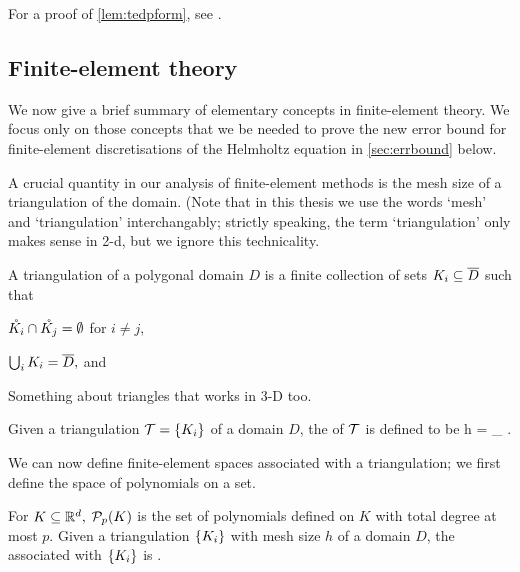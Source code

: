 For a proof of \cref{lem:tedpform}, see \cite[Lemma A.7]{GrPeSp:19}.
  
\subsection{Finite-element theory}\label{sec:fetheory}

We now give a brief summary of elementary concepts in finite-element theory. We focus only on those concepts that we be needed to
prove the new error bound for finite-element discretisations of the Helmholtz equation in \cref{sec:errbound} below.

    A crucial quantity in our analysis of finite-element methods is the mesh size of a triangulation of the domain. (Note that in this thesis we use the words `mesh' and `triangulation' interchangably; strictly speaking, the term `triangulation' only makes sense in 2-d, but we ignore this technicality.

    \bde[Triangulation]
    A triangulation of a polygonal domain $D$ is a finite collection of sets $K_{i} \subseteq \overline{D}$ such that
    \ben
  \item $\mathring{K_{i}} \cap \mathring{K_{j}} = \emptyset$ for $ i \neq j,$
  \item $\bigcup_i K_{i} = \overline{D},$ and
    \item Something about triangles that works in 3-D too.
    \een
    \ede{}

Given a triangulation $\cT = \set{\Ki}$ of a domain $D$, the  of $\mathcal T$ is defined to be
\beqs
h = \max_{\Ki} \diam{\Ki}.
\eeqs
\ede

    We can now define finite-element spaces associated with a triangulation; we first define the space of polynomials on a set.

For $K \subseteq \mathbb R^{d},$ $\polyp{K}$ is the set of polynomials defined on $K$ with total degree at most $p.$
\ede
    \label{def:fespace}
    Given a triangulation $\set{\Ki}$ with mesh size $h$ of a domain $D$, the  associated with $\set{\Ki}$ is
    \beqs
\Vhp \de {}.
    \eeqs
    \ede

